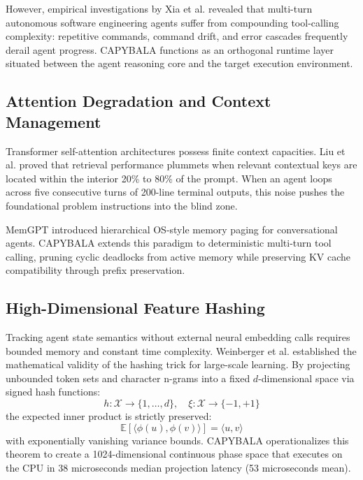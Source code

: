 \documentclass[journal]{IEEEtran}
\begin{document}
However, empirical investigations by Xia et al. \cite{xia2025demystifying} revealed that multi-turn autonomous software engineering agents suffer from compounding tool-calling complexity: repetitive commands, command drift, and error cascades frequently derail agent progress. CAPYBALA functions as an orthogonal runtime layer situated between the agent reasoning core and the target execution environment.

\subsection{Attention Degradation and Context Management}
Transformer self-attention architectures \cite{vaswani2017attention} possess finite context capacities. Liu et al. \cite{liu2024lost} proved that retrieval performance plummets when relevant contextual keys are located within the interior 20\% to 80\% of the prompt. When an agent loops across five consecutive turns of 200-line terminal outputs, this noise pushes the foundational problem instructions into the blind zone. 

MemGPT \cite{packer2023memgpt} introduced hierarchical OS-style memory paging for conversational agents. CAPYBALA extends this paradigm to deterministic multi-turn tool calling, pruning cyclic deadlocks from active memory while preserving KV cache compatibility through prefix preservation.

\subsection{High-Dimensional Feature Hashing}
Tracking agent state semantics without external neural embedding calls requires bounded memory and constant time complexity. Weinberger et al. \cite{weinberger2009feature} established the mathematical validity of the hashing trick for large-scale learning. By projecting unbounded token sets and character n-grams into a fixed $d$-dimensional space via signed hash functions:
\begin{equation}
h: \mathcal{X} \to \{1, \dots, d\}, \quad \xi: \mathcal{X} \to \{-1, +1\}
\end{equation}
the expected inner product is strictly preserved:
\begin{equation}
\mathbb{E}[\langle \phi(u), \phi(v) \rangle] = \langle u, v \rangle
\end{equation}
with exponentially vanishing variance bounds. CAPYBALA operationalizes this theorem to create a 1024-dimensional continuous phase space that executes on the CPU in 38 microseconds median projection latency (53 microseconds mean).
\end{document}
